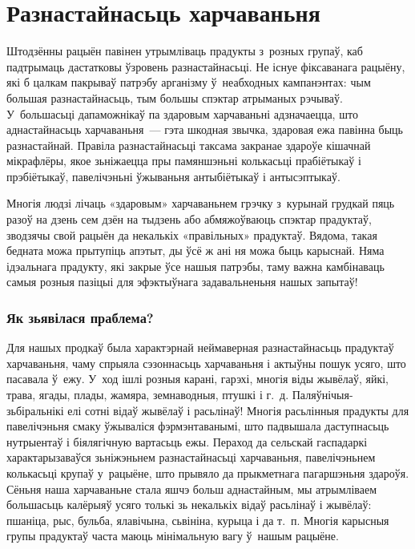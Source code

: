 \chapter{Разнастайнасьць харчаваньня}

Штодзённы рацыён павінен утрымліваць прадукты з~розных групаў, каб падтрымаць дастатковы ўзровень разнастайнасьці. Не існуе фіксаванага рацыёну, які б цалкам пакрываў патрэбу арганізму ў~неабходных кампанэнтах: чым большая разнастайнасьць, тым большы спэктар атрыманых рэчываў. У~большасьці дапаможнікаў па здаровым харчаваньні адзначаецца, што аднастайнасьць харчаваньня~--- гэта шкодная звычка, здаровая ежа павінна быць разнастайнай. Правіла разнастайнасьці таксама закранае здароўе кішачнай мікрафлёры, якое зьніжаецца пры памяншэньні колькасьці прабіётыкаў і прэбіётыкаў, павелічэньні ўжываньня антыбіётыкаў і антысэптыкаў.

Многія людзі лічаць «здаровым» харчаваньнем грэчку з~курынай грудкай пяць разоў на дзень сем дзён на тыдзень або абмяжоўваюць спэктар прадуктаў, зводзячы свой рацыён да некалькіх «правільных» прадуктаў. Вядома, такая бедната можа прытупіць апэтыт, ды ўсё ж ані ня можа быць карыснай. Няма ідэальнага прадукту, які закрые ўсе нашыя патрэбы, таму важна камбінаваць самыя розныя пазіцыі для эфэктыўнага задавальненьня нашых запытаў!

\subsection{Як зьявілася праблема?}

Для нашых продкаў была характэрнай неймаверная разнастайнасьць прадуктаў харчаваньня, чаму спрыяла сэзоннасьць харчаваньня і актыўны пошук усяго, што пасавала ў~ежу. У~ход ішлі розныя карані, гарэхі, многія віды жывёлаў, яйкі, трава, ягады, плады, жамяра, земнаводныя, птушкі і г.~д. Паляўнічыя-зьбіральнікі елі сотні відаў жывёлаў і расьлінаў! Многія расьлінныя прадукты для павелічэньня смаку ўжываліся фэрмэнтаванымі, што падвышала даступнасьць нутрыентаў і біялягічную вартасьць ежы. Пераход да сельскай гаспадаркі характарызаваўся зьніжэньнем разнастайнасьці харчаваньня, павелічэньнем колькасьці крупаў у~рацыёне, што прывяло да прыкметнага пагаршэньня здароўя. Сёньня наша харчаваньне стала яшчэ больш аднастайным, мы атрымліваем большасьць калёрыяў усяго толькі зь некалькіх відаў расьлінаў і жывёлаў: пшаніца, рыс, бульба, ялавічына, сьвініна, курыца і да т.~п. Многія карысныя групы прадуктаў часта маюць мінімальную вагу ў~нашым рацыёне.

